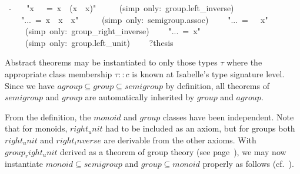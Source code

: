 \begin{isabelle}
~-\isanewline
~~~{"}x~{\isasymOtimes}~{\isasymunit}~=~x~{\isasymOtimes}~(x{\isasyminv}~{\isasymOtimes}~x){"}\isanewline
~~~~~(simp~only:~group.left\_inverse)\isanewline
~~~~{"}...~=~x~{\isasymOtimes}~x{\isasyminv}~{\isasymOtimes}~x{"}\isanewline
~~~~~(simp~only:~semigroup.assoc)\isanewline
~~~~{"}...~=~{\isasymunit}~{\isasymOtimes}~x{"}\isanewline
~~~~~(simp~only:~group\_right\_inverse)\isanewline
~~~~{"}...~=~x{"}\isanewline
~~~~~(simp~only:~group.left\_unit)\isanewline
~~~~?thesis~\isanewline
{}%
\begin{isamarkuptext}%
\medskip Abstract theorems may be instantiated to only those types
 $\tau$ where the appropriate class membership $\tau :: c$ is known at
 Isabelle's type signature level.  Since we have $agroup \subseteq
 group \subseteq semigroup$ by definition, all theorems of $semigroup$
 and $group$ are automatically inherited by $group$ and $agroup$.%
\end{isamarkuptext}%
%
%
\begin{isamarkuptext}%
From the definition, the $monoid$ and $group$ classes have been
 independent.  Note that for monoids, $right_unit$ had to be included
 as an axiom, but for groups both $right_unit$ and $right_inverse$ are
 derivable from the other axioms.  With $group_right_unit$ derived as
 a theorem of group theory (see page~\pageref{thm:group-right-unit}),
 we may now instantiate $monoid \subseteq semigroup$ and $group
 \subseteq monoid$ properly as follows
 (cf.\ ).


\end{isamarkuptext}
\end{isabelle}
